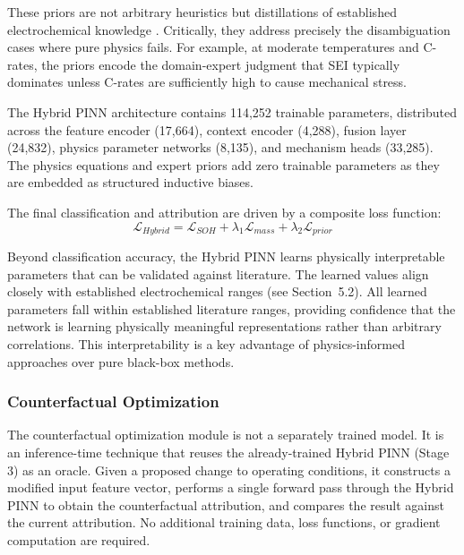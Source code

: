 \documentclass[5p,times,authoryear]{elsarticle}
\begin{document}
These priors are not arbitrary heuristics but distillations of established electrochemical knowledge \citep{vetter2005ageing, waldmann2014temperature, zhang2020degradation}. Critically, they address precisely the disambiguation cases where pure physics fails. For example, at moderate temperatures and C-rates, the priors encode the domain-expert judgment that SEI typically dominates unless C-rates are sufficiently high to cause mechanical stress.


The Hybrid PINN architecture contains 114,252 trainable parameters, distributed across the feature encoder (17,664), context encoder (4,288), fusion layer (24,832), physics parameter networks (8,135), and mechanism heads (33,285). The physics equations and expert priors add zero trainable parameters as they are embedded as structured inductive biases.

The final classification and attribution are driven by a composite loss function:
\begin{equation}
\mathcal{L}_{Hybrid} = \mathcal{L}_{SOH} + \lambda_1 \mathcal{L}_{mass} + \lambda_2 \mathcal{L}_{prior}
\label{eq:hybrid_loss}
\end{equation}



Beyond classification accuracy, the Hybrid PINN learns physically interpretable parameters that can be validated against literature. The learned values align closely with established electrochemical ranges (see Section~5.2).
All learned parameters fall within established literature ranges, providing confidence that the network is learning physically meaningful representations rather than arbitrary correlations. This interpretability is a key advantage of physics-informed approaches over pure black-box methods.




\subsubsection{Counterfactual Optimization}

The counterfactual optimization module is not a separately trained model. It is an inference-time technique that reuses the already-trained Hybrid PINN (Stage 3) as an oracle. Given a proposed change to operating conditions, it constructs a modified input feature vector, performs a single forward pass through the Hybrid PINN to obtain the counterfactual attribution, and compares the result against the current attribution. No additional training data, loss functions, or gradient computation are required.
\end{document}
